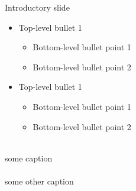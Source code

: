 \documentclass[LaTeX2e,10pt,aspectratio=169]{beamer}
\begin{document}
\begin{frame}{Introductory slide}
\begin{minipage}{0.50\textwidth}  %
\begin{itemize}			%
\item Top-level bullet 1
\begin{itemize}
\item Bottom-level bullet point 1
\item Bottom-level bullet point 2
\end{itemize}
\item Top-level bullet 1
\begin{itemize}
\item Bottom-level bullet point 1
\item Bottom-level bullet point 2
\end{itemize} 
\end{itemize}
\end{minipage}
\begin{minipage}{0.26\textwidth} %
\centering
\vspace{0.15cm}
\\
 some caption  \\
\vspace{0.15cm}
\\
 some other caption  \\
\end{minipage}
\end{frame}
\end{document}
